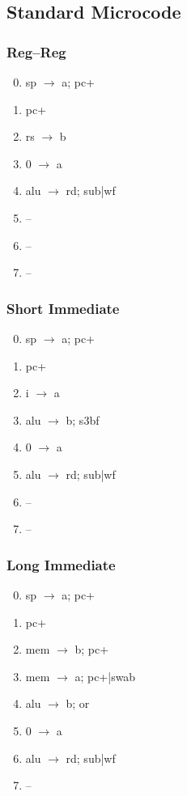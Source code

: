 \documentclass[11pt]{book}
\begin{document}
\subsection*{Standard Microcode}
\begin{multicols}{3}\ttfamily\selectfont\small
  \subsubsection*{Reg--Reg}
  \begin{enumerate}\setcounter{enumi}{-1}
  \item sp \(\rightarrow\) a; pc+
  \item pc+
  \item rs \(\rightarrow\) b
  \item 0 \(\rightarrow\) a
  \item alu \(\rightarrow\) rd; sub|wf
  \item --
  \item --
  \item --
  \end{enumerate}
  \columnbreak
  \subsubsection*{Short Immediate}
  \begin{enumerate}\setcounter{enumi}{-1}
  \item sp \(\rightarrow\) a; pc+
  \item pc+
  \item i \(\rightarrow\) a
  \item alu \(\rightarrow\) b; s3bf
  \item 0 \(\rightarrow\) a
  \item alu \(\rightarrow\) rd; sub|wf
  \item --
  \item --
  \end{enumerate}
  \columnbreak
  \subsubsection*{Long Immediate}
  \begin{enumerate}\setcounter{enumi}{-1}
  \item sp \(\rightarrow\) a; pc+
  \item pc+
  \item mem \(\rightarrow\) b; pc+
  \item mem \(\rightarrow\) a; pc+|swab
  \item alu \(\rightarrow\) b; or
  \item 0 \(\rightarrow\) a
  \item alu \(\rightarrow\) rd; sub|wf
  \item --
  \end{enumerate}
\end{multicols}
\end{document}
